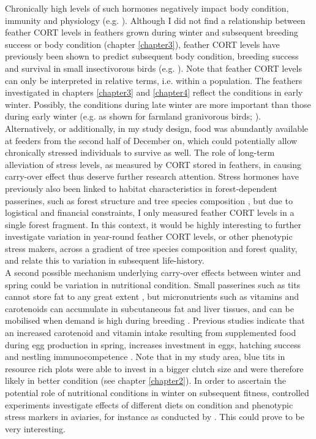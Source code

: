 \documentclass[10pt, twoside]{book} %
\begin{document}
Chronically high levels of such hormones negatively impact body condition, immunity and physiology (e.g. \citealt{Gao2017}). Although I did not find a relationship between feather CORT levels in feathers grown during winter and subsequent breeding success or body condition (chapter \ref{chapter3}), feather CORT levels have previously been shown to predict subsequent body condition, breeding success and survival in small insectivorous birds (e.g. \citealt{Koren2012, Harms2015, Boves2016, Monclus2020}). Note that feather CORT levels can only be interpreted in relative terms, i.e. within a population. The feathers investigated in chapters \ref{chapter3} and \ref{chapter4} reflect the conditions in early winter. Possibly, the conditions during late winter are more important than those during early winter (e.g. as shown for farmland granivorous birds; \citealt{Siriwardena2008}). Alternatively, or additionally, in my study design, food was abundantly available at feeders from the second half of December on, which could potentially allow chronically stressed individuals to survive as well. The role of long-term alleviation of stress levels, as measured by CORT stored in feathers, in causing carry-over effect thus deserve further research attention. Stress hormones have previously also been linked to habitat characteristics in forest-dependent passerines, such as forest structure \citep{Suorsa2003a} and tree species composition \citep{Cirule2017, Henderson2017}, but due to logistical and financial constraints, I only measured feather CORT levels in a single forest fragment. In this context, it would be highly interesting to further investigate variation in year-round feather CORT levels, or other phenotypic stress makers, across a gradient of tree species composition and forest quality, and relate this to variation in subsequent life-history.\\

A second possible mechanism underlying carry-over effects between winter and spring could be variation in nutritional condition. Small passerines such as tits cannot store fat to any great extent \citep{Drent1980}, but micronutrients such as vitamins and carotenoids can accumulate in subcutaneous fat and liver tissues, and can be mobilised when demand is high during breeding \citep{Plummer2013a}. Previous studies indicate that an increased carotenoid and vitamin intake resulting from supplemented food during egg production in spring, increases investment in eggs, hatching success and nestling immunocompetence \citep{Saino2003, Møller2008}. Note that in my study area, blue tits in resource rich plots were able to invest in a bigger clutch size and were therefore likely in better condition (see chapter \ref{chapter2}). In order to ascertain the potential role of nutritional conditions in winter on subsequent fitness, controlled experiments investigate effects of different diets on condition and phenotypic stress markers in aviaries, for instance as conducted by \citet{SallehHudin2016}. This could prove to be very interesting.\\
\end{document}
